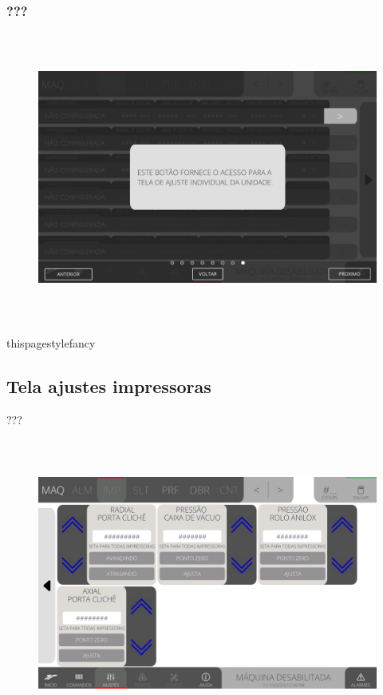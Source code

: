 \newpage
\thispagestyle{fancy}
\vspace*{\fill}
\subsubsection{\small{???}}
\begin{figure}[h]
  \centering
  \includegraphics[width=576px,height=360px]{src/imagesFlexo/04-printter/01-printters/settings/e-8.png}
   \label{}
\end{figure}
\vspace*{\fill}

\newpage
thispagestyle{fancy}
\vspace*{\fill}
\subsection{Tela ajustes impressoras}
 ???
\begin{figure}[h]
  \centering
  \includegraphics[width=576px,height=360px]{src/imagesFlexo/04-printter/01-printters/settings/e-Tela-Principal-2.png}
   \label{}
\end{figure}


